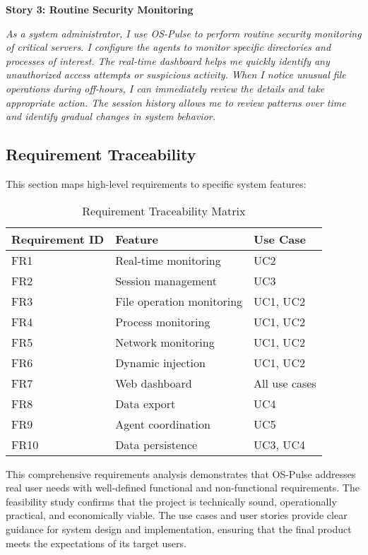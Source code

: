 \textbf{Story 3: Routine Security Monitoring}

\textit{As a system administrator, I use OS-Pulse to perform routine security monitoring of critical servers. I configure the agents to monitor specific directories and processes of interest. The real-time dashboard helps me quickly identify any unauthorized access attempts or suspicious activity. When I notice unusual file operations during off-hours, I can immediately review the details and take appropriate action. The session history allows me to review patterns over time and identify gradual changes in system behavior.}

\subsection{Requirement Traceability}

This section maps high-level requirements to specific system features:

\begin{table}[h]
\centering
\begin{tabular}{|l|l|l|}
\hline
\textbf{Requirement ID} & \textbf{Feature} & \textbf{Use Case} \\
\hline
FR1 & Real-time monitoring & UC2 \\
FR2 & Session management & UC3 \\
FR3 & File operation monitoring & UC1, UC2 \\
FR4 & Process monitoring & UC1, UC2 \\
FR5 & Network monitoring & UC1, UC2 \\
FR6 & Dynamic injection & UC1, UC2 \\
FR7 & Web dashboard & All use cases \\
FR8 & Data export & UC4 \\
FR9 & Agent coordination & UC5 \\
FR10 & Data persistence & UC3, UC4 \\
\hline
\end{tabular}
\caption{Requirement Traceability Matrix}
\end{table}

This comprehensive requirements analysis demonstrates that OS-Pulse addresses real user needs with well-defined functional and non-functional requirements. The feasibility study confirms that the project is technically sound, operationally practical, and economically viable. The use cases and user stories provide clear guidance for system design and implementation, ensuring that the final product meets the expectations of its target users.